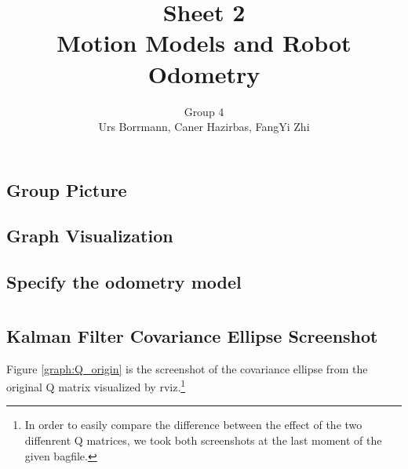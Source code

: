 \documentclass[14pt,a4paper]{article}
\title{\textbf{Sheet 2} \\  \textbf{Motion Models and Robot Odometry}}
\author{Group 4 \\Urs Borrmann, Caner Hazirbas, FangYi Zhi}
\begin{document}
\maketitle
\onehalfspacing

\section{}
	\subsection{Group Picture}


	\subsection{Graph Visualization}


	\subsection{Specify the odometry model}


\section{}
	\subsection{Kalman Filter Covariance Ellipse Screenshot}
		Figure \ref{graph:Q_origin} is the screenshot of the covariance ellipse from the original Q matrix visualized by rviz.\footnote{In order to easily compare the difference between the effect of the two diffenrent Q matrices, we took both screenshots at the last moment of the given bagfile.}\\
	
\end{document}
